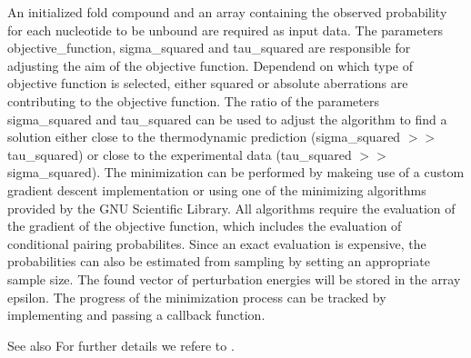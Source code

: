 An initialized fold compound and an array containing the observed probability for each nucleotide to be unbound are required as input data. The parameters objective\+\_\+function, sigma\+\_\+squared and tau\+\_\+squared are responsible for adjusting the aim of the objective function. Dependend on which type of objective function is selected, either squared or absolute aberrations are contributing to the objective function. The ratio of the parameters sigma\+\_\+squared and tau\+\_\+squared can be used to adjust the algorithm to find a solution either close to the thermodynamic prediction (sigma\+\_\+squared $>$$>$ tau\+\_\+squared) or close to the experimental data (tau\+\_\+squared $>$$>$ sigma\+\_\+squared). The minimization can be performed by makeing use of a custom gradient descent implementation or using one of the minimizing algorithms provided by the G\+NU Scientific Library. All algorithms require the evaluation of the gradient of the objective function, which includes the evaluation of conditional pairing probabilites. Since an exact evaluation is expensive, the probabilities can also be estimated from sampling by setting an appropriate sample size. The found vector of perturbation energies will be stored in the array epsilon. The progress of the minimization process can be tracked by implementing and passing a callback function.

\begin{DoxySeeAlso}{See also}
For further details we refere to \cite{washietl:2012}.
\end{DoxySeeAlso}

